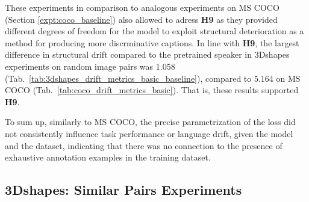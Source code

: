 These experiments in comparison to analogous experiments on MS COCO (Section \ref{expt:coco_baseline}) also allowed to adress \textbf{H9} as they provided different degrees of freedom for the model to exploit structural deterioration as a method for producing more discrminative captions. In line with \textbf{H9}, the largest difference in structural drift compared to the pretrained speaker in 3Dshapes experiments on random image pairs was 1.058 (Tab.~\ref{tab:3dshapes_drift_metrics_basic_baseline}), compared to 5.164 on MS COCO (Tab.~\ref{tab:coco_drift_metrics_basic}). That is, these results supported \textbf{H9}.

To sum up, similarly to MS COCO, the precise parametrization of the loss did not consistently influence task performance or language drift, given the model and the dataset, indicating that there was no connection to the presence of exhaustive annotation examples in the training dataset.

\subsection{3Dshapes: Similar Pairs Experiments}
\label{expt:3dsapes_similar}

